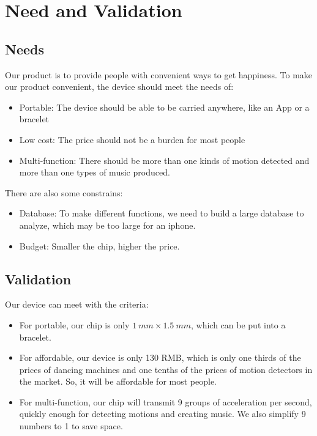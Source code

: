 \section{Need and Validation}

\subsection{Needs}

 Our product is to provide people with convenient ways to get happiness.
 To make our product convenient, the device should meet the needs of:

\begin{itemize}
\item Portable: The device should be able to be carried anywhere, like an App or
  a bracelet 
\item Low cost: The price should not be a burden for most people
\item Multi-function: There should be more than one kinds of motion detected and
  more than one types of music produced. 
\end{itemize}

 There are also some constrains:

\begin{itemize}
\item Database: To make different functions, we need to build a large database
  to analyze, which may be too large for an iphone. 
\item Budget: Smaller the chip, higher the price.
\end{itemize}

\subsection{Validation}

 Our device can meet with the criteria:

\begin{itemize}
\item For portable, our chip is only $1\ mm \times 1.5\ mm$, which can be put into a
  bracelet. 
\item For affordable, our device is only 130 RMB, which is only one thirds of
  the prices of dancing machines and one tenths of the prices of motion
  detectors in the market.  So, it will be affordable for most people.  
\item For multi-function, our chip will transmit 9 groups of acceleration per
  second, quickly enough for detecting motions and creating music. We also
  simplify 9 numbers to 1 to save space. 
\end{itemize}
